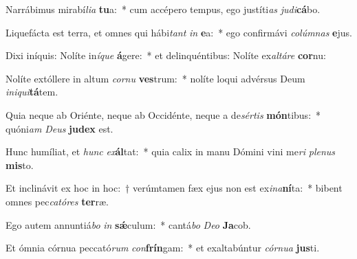 \item Narrábimus mirabí\textit{li}\textit{a} \textbf{tu}a:~* cum accépero tempus, ego justíti\textit{as} \textit{ju}\textit{di}\textbf{cá}bo.
\item Liquefácta est terra, et omnes qui hábi\textit{tant} \textit{in} \textbf{e}a:~* ego confirmávi \textit{co}\textit{lúm}\textit{nas} \textbf{e}jus.
\item Dixi iníquis: Nolíte in\textit{í}\textit{que} \textbf{á}gere:~* et delinquéntibus: Nolíte ex\textit{al}\textit{tá}\textit{re} \textbf{cor}nu:
\item Nolíte extóllere in altum \textit{cor}\textit{nu} \textbf{ves}trum:~* nolíte loqui advérsus Deum \textit{in}\textit{i}\textit{qui}\textbf{tá}tem.
\item Quia neque ab Oriénte, neque ab Occidénte, neque a de\textit{sér}\textit{tis} \textbf{món}tibus:~* quóni\textit{am} \textit{De}\textit{us} \textbf{ju}\textbf{dex} est.
\item Hunc humíliat, et \textit{hunc} \textit{ex}\textbf{ál}tat:~* quia calix in manu Dómini vini me\textit{ri} \textit{ple}\textit{nus} \textbf{mis}to.
\item Et inclinávit ex hoc in hoc:~† verúmtamen fæx ejus non est ex\textit{i}\textit{na}\textbf{ní}ta:~* bibent omnes pec\textit{ca}\textit{tó}\textit{res} \textbf{ter}ræ.
\item Ego autem annuntiá\textit{bo} \textit{in} \textbf{sǽ}culum:~* cantá\textit{bo} \textit{De}\textit{o} \textbf{Ja}cob.
\item Et ómnia córnua peccató\textit{rum} \textit{con}\textbf{frín}gam:~* et exaltabúntur \textit{cór}\textit{nu}\textit{a} \textbf{jus}ti.
